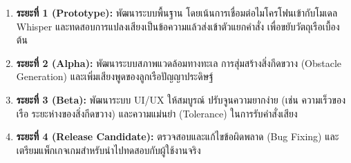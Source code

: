 \begin{enumerate}[label=\arabic*)]
    \item \textbf{ระยะที่ 1 (Prototype):} พัฒนาระบบพื้นฐาน โดยเน้นการเชื่อมต่อไมโครโฟนเข้ากับโมเดล Whisper และทดสอบการแปลงเสียงเป็นข้อความแล้วส่งเข้าตัวแยกคำสั่ง เพื่อขยับวัตถุเรือเบื้องต้น
    \item \textbf{ระยะที่ 2 (Alpha):} พัฒนาระบบสภาพแวดล้อมทางทะเล การสุ่มสร้างสิ่งกีดขวาง (Obstacle Generation) และเพิ่มเสียงพูดของลูกเรือปัญญาประดิษฐ์
    \item \textbf{ระยะที่ 3 (Beta):} พัฒนาระบบ UI/UX ให้สมบูรณ์ ปรับจูนความยากง่าย (เช่น ความเร็วของเรือ ระยะห่างของสิ่งกีดขวาง) และความแม่นยำ (Tolerance) ในการรับคำสั่งเสียง
    \item \textbf{ระยะที่ 4 (Release Candidate):} ตรวจสอบและแก้ไขข้อผิดพลาด (Bug Fixing) และเตรียมแพ็กเกจเกมสำหรับนำไปทดสอบกับผู้ใช้งานจริง
\end{enumerate}